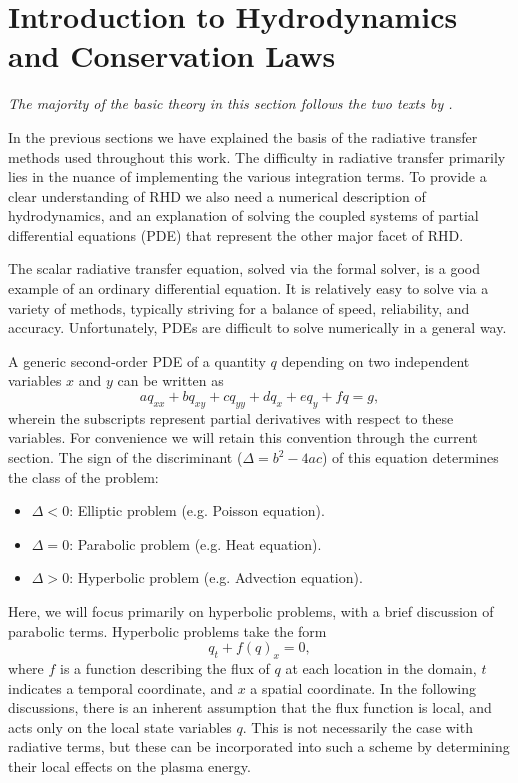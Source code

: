 \section{Introduction to Hydrodynamics and Conservation Laws}\label{Sec:IntroConsLaws}
\emph{The majority of the basic theory in this section follows the two texts by \citet{LeVeque1997,LeVeque2002}.}

In the previous sections we have explained the basis of the radiative transfer methods used throughout this work.
The difficulty in radiative transfer primarily lies in the nuance of implementing the various integration terms.
To provide a clear understanding of RHD we also need a numerical description of hydrodynamics, and an explanation of solving the coupled systems of partial differential equations (PDE) that represent the other major facet of RHD.

The scalar radiative transfer equation, solved via the formal solver, is a good example of an ordinary differential equation.
It is relatively easy to solve via a variety of methods, typically striving for a balance of speed, reliability, and accuracy.
Unfortunately, PDEs are difficult to solve numerically in a general way.

A generic second-order PDE of a quantity $q$ depending on two independent variables $x$ and $y$ can be written as
\begin{equation}
    aq_{xx} + bq_{xy} + cq_{yy} + dq_x + eq_y + fq = g,
\end{equation}
wherein the subscripts represent partial derivatives with respect to these variables.
For convenience we will retain this convention through the current section.
The sign of the discriminant ($\Delta = b^2-4ac$) of this equation determines the class of the problem:
\begin{itemize}
    \item $\Delta < 0$: Elliptic problem (e.g. Poisson equation).
    \item $\Delta = 0$: Parabolic problem (e.g. Heat equation).
    \item $\Delta > 0$: Hyperbolic problem (e.g. Advection equation).
\end{itemize}
Here, we will focus primarily on hyperbolic problems, with a brief discussion of parabolic terms.
Hyperbolic problems take the form
\begin{equation}\label{Eq:ConsLaw}
    q_t + f(q)_x = 0,
\end{equation}
where $f$ is a function describing the flux of $q$ at each location in the domain, $t$ indicates a temporal coordinate, and $x$ a spatial coordinate.
In the following discussions, there is an inherent assumption that the flux function is local, and acts only on the local state variables $q$.
This is not necessarily the case with radiative terms, but these can be incorporated into such a scheme by determining their local effects on the plasma energy.

